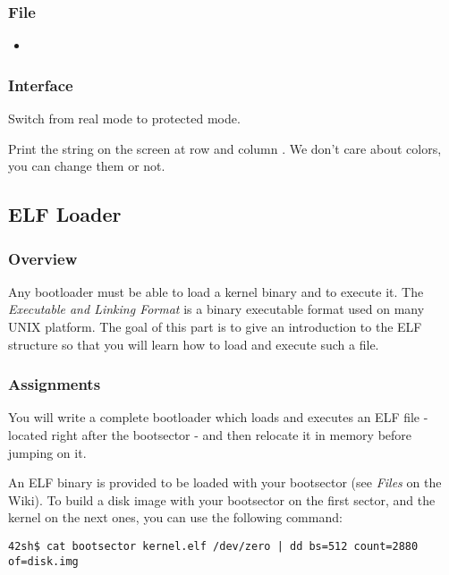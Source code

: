 \subsubsection*{File}
\begin{itemize}
  \item {}
\end{itemize}

\subsubsection*{Interface}
{
  Switch from real mode to protected mode.
}

{
  Print the string  on the screen at row 
  and column . We don't care about colors, you can change them
  or not.
}

%
%

\newpage

\subsection{ELF Loader}

\subsubsection*{Overview}
Any bootloader must be able to load a kernel binary and to execute it.
The \emph{Executable and Linking Format} is a binary executable format used on
many UNIX platform. The goal of this part is to give an introduction to the
ELF structure so that you will learn how to load and execute such a file.

\subsubsection*{Assignments}
You will write a complete bootloader which loads and executes an ELF file
- located right after the bootsector - and then relocate it in memory
before jumping on it.

An ELF binary is provided to be loaded with your bootsector (see \emph{Files}
on the Wiki). To build a disk image with your bootsector on the first sector,
and the kernel on the next ones, you can use the following command:

\begin{verbatim}
42sh$ cat bootsector kernel.elf /dev/zero | dd bs=512 count=2880 of=disk.img
\end{verbatim}

